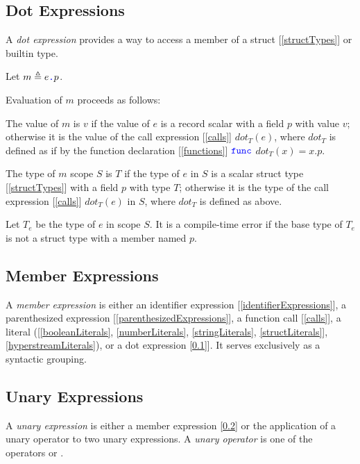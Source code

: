\documentclass{article}
\begin{document}
\subsection{Dot Expressions}
\label{dotExpressions}

A {\em dot expression} provides a way to access a member of a struct [\ref{structTypes}] or builtin type.

\DotExpression{}

Let $m \triangleq e\texttt{\color{blue} .}{}p$.

Evaluation of $m$ proceeds as follows:

The value of $m$ is $v$ if the value of $e$ is a record scalar with a field $p$ with value $v$; otherwise it is the value of the call expression [\ref{calls}] $dot_T(e)$, where $dot_T$ is defined as if by the function declaration  [\ref{functions}] $\texttt{\color{blue} func}{}$ $dot_T(x) = x.p$.


The type of $m$ scope $S$
 is $T$ if the type of $e$ in $S$ is a scalar struct type [\ref{structTypes}] with a field $p$ with type $T$; otherwise it is the type of the call expression [\ref{calls}] $dot_T(e)$ in $S$, where $dot_T$ is defined as above.

Let $T_e$ be the type of $e$ in scope $S$.  It is a compile-time error if the base type of $T_e$ is not a struct type with a member named $p$. 

\subsection{Member Expressions}
\label{memberExpression}

A {\em member expression} is either an identifier expression [\ref{identifierExpressions}], a parenthesized expression [\ref{parenthesizedExpressions}], a function call [\ref{calls}], a literal ([\ref{booleanLiterals}, \ref{numberLiterals}, \ref{stringLiterals}, \ref{structLiterals}], \ref{hyperstreamLiterals}), or a dot expression [\ref{dotExpressions}]]. It serves exclusively as a syntactic grouping.


\subsection{Unary Expressions}
\label{unaryExpressions}

A {\em unary expression} is either a member expression [\ref{memberExpression}] or the application of a unary operator to two unary expressions.
A {\em unary operator} is one of the operators \MINUS{} or  \NOT{}. 
\end{document}
